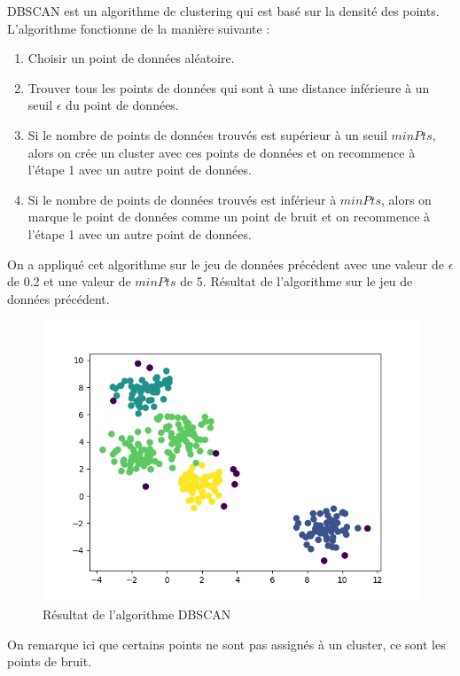 \documentclass[french,a4paper,18pt]{article}
\begin{document}
DBSCAN est un algorithme de clustering qui est basé sur la densité des points. 
L'algorithme fonctionne de la manière suivante :
\begin{enumerate}
    \item Choisir un point de données aléatoire.
    \item Trouver tous les points de données qui sont à une distance inférieure à un seuil $\epsilon$ du point de données.
    \item Si le nombre de points de données trouvés est supérieur à un seuil $minPts$, alors on crée un cluster avec ces points de données et on recommence à l'étape 1 avec un autre point de données.
    \item Si le nombre de points de données trouvés est inférieur à $minPts$, alors on marque le point de données comme un point de bruit et on recommence à l'étape 1 avec un autre point de données.
\end{enumerate}

On a appliqué cet algorithme sur le jeu de données précédent avec une valeur de $\epsilon$ de 0.2 et une valeur de $minPts$ de 5.
Résultat de l'algorithme sur le jeu de données précédent.
\begin{figure}[h!]
    \centering
    \includegraphics[scale=0.5]{images/short_simulation_dbscan.png}
    \caption{Résultat de l'algorithme DBSCAN}\label{fig:short_simulation_dbscan}
\end{figure}

On remarque ici que certains points ne sont pas assignés à un cluster, ce sont les points de bruit.

\pagebreak
\end{document}
